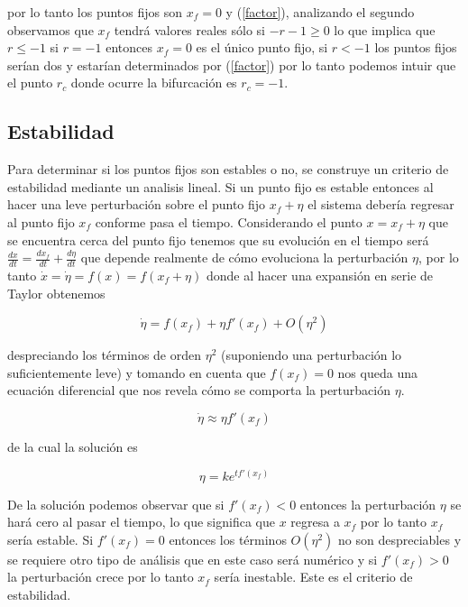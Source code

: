 \documentclass[10pt]{article}
\begin{document}
por lo tanto los puntos fijos son $x_f=0$ y (\ref{factor}), analizando el segundo observamos que $x_f$ tendr\'a valores reales s\'olo si 
$-r-1\geq0$ lo que implica que $r\leq-1$ si $r=-1$ entonces $x_f=0$ es el \'unico punto fijo, si $r<-1$ los puntos fijos ser\'ian dos y 
estar\'ian determinados por (\ref{factor}) por lo tanto podemos intuir que el punto $r_c$ donde ocurre la bifurcaci\'on es $r_c=-1$.

\subsection{Estabilidad}
Para determinar si los puntos fijos son estables o no, se construye un criterio de estabilidad mediante un analisis lineal. Si un punto fijo 
es 
estable 
entonces al hacer 
una leve perturbaci\'on sobre el punto fijo $x_f+\eta$ el sistema deber\'ia regresar al punto fijo $x_f$ conforme pasa el tiempo. Considerando 
el punto $x=x_f + \eta$ que se encuentra cerca del punto fijo tenemos que su evoluci\'on en el tiempo ser\'a $\frac{dx}{dt}= \frac{dx_f}{dt} + 
\frac{d\eta}{dt}$ que depende realmente de c\'omo evoluciona la perturbaci\'on $\eta$, por lo tanto $\dot{x}=\dot{\eta}=f(x)=f(x_f+\eta)$ 
donde al hacer una expansi\'on en serie de Taylor obtenemos

\begin{equation}
	\dot{\eta}=f(x_f) + \eta f'(x_f) + O(\eta^2)
\label{cond3}
\end{equation}

despreciando los t\'erminos de orden $\eta^2$ (suponiendo una perturbaci\'on lo suficientemente leve) y tomando en cuenta que $f(x_f)=0$ nos 
queda una ecuaci\'on 
diferencial que nos revela c\'omo se 
comporta la perturbaci\'on $\eta$.

\begin{equation}
	\dot{\eta} \approx \eta f'(x_f)
\label{cond4}
\end{equation}

de la cual la soluci\'on es 

\begin{equation}
	\eta=ke^{tf'(x_f)}
\label{cond5}
\end{equation}

De la soluci\'on podemos observar que si $f'(x_f)<0$ entonces la perturbaci\'on $\eta$ se har\'a cero al pasar el tiempo, lo que significa que 
$x$ regresa a $x_f$ por lo tanto $x_f$ ser\'ia estable. Si $f'(x_f)=0$ entonces los t\'erminos $O(\eta^2)$ no son despreciables y se requiere 
otro tipo de an\'alisis que en este caso ser\'a num\'erico y si $f'(x_f)>0$ la 
perturbaci\'on crece por lo tanto $x_f$ ser\'ia inestable. Este es el criterio de estabilidad. 
\end{document}
